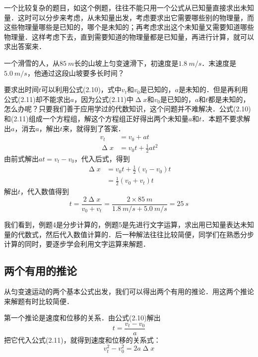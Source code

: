 一个比较复杂的题目，如这个例题，往往不能只用一个公式从已知量直接求出未知量．这时可以分步来考虑，从未知量出发，考虑要求出它需要哪些别的物理量，而这些物理量哪些是已知的，哪个是未知的；再考虑求出这个未知量又需要知道哪些物理量．这样考虑下去，直到需要知道的物理量都是已知量，再进行计算，就可以求出答案来．

\begin{Example}
    一个滑雪的人，从$\qty{85}{m}$长的山坡上匀变速滑下，初速度是$\qty{1.8}{m/s}$．末速度是$\qty{5.0}{m/s}$，他通过这段山坡要多长时间？
\end{Example}

\begin{Answer}
    要求出时间$t$可以利用公式(2.10)，式中$v_t$和$v_0$是已知的，$a$是未知的．但是再利用公式(2.11)却不能求出$a$，因为公式(2.11)中$\upDelta x$和$v_0$是已知的，$a$和$t$都是未知的，怎么办呢？只要我们善于应用学过的代数知识，这个问题并不难解决．公式(2.10)和(2.11)组成一个方程组，解这个方程组正好得出两个未知量$a$和$t$．本题不要求解出$a$，消去$a$，解出$t$来，就得到了答案．
    \begin{align*}
        v_t        & =v_0+at                \\
        \upDelta x & =v_0 t+\frac{1}{2}at^2
    \end{align*}
    由前式解出$at=v_t-v_0$，代入后式，得到
    \[\begin{split}
            \upDelta x & =v_0t+\frac{1}{2}(v_t-v_0)t \\
                       & =\frac{1}{2}(v_0+v_t)t
        \end{split} \]
    解出$t$，代入数值得到
    \[t=\frac{2\upDelta x}{v_0+v_t}=\frac{2\times \qty{85}{m}}{\qty{1.8}{m/s}+\qty{5.0}{m/s}}=\qty{25}{s} \]
\end{Answer}

我们看到，例题4是分步计算的，例题5是先进行文字运算，求出用已知量表达未知量的代数式，然后代入数值计算的．后一种解法往往比较简便，同学们在熟悉分步计算的同时，要逐步学会利用文字运算来解题．

\subsection{两个有用的推论}

从匀变速运动的两个基本公式出发，我们可以得出两个有用的推论．用这两个推论来解题有时比较简便．

第一个推论是速度和位移的关系．由公式(2.10)解出
\[t=\frac{v_t-v_0}{a} \]
把它代入公式(2.11)，就得到速度和位移的关系式：
\begin{equation}
    v^2_t-v^2_0=2a\upDelta x
\end{equation}

